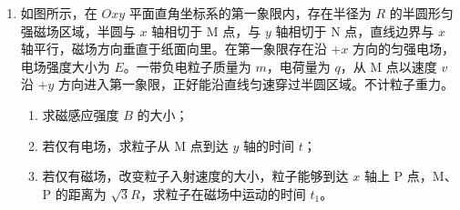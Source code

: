 \documentclass[\gkver]{gaokaozhenti}
\begin{document}
\begin{enumerate}
\item
如图所示，在 $Oxy$ 平面直角坐标系的第一象限内，存在半径为 $R$ 的半圆形匀强磁场区域，半圆与 $x$ 轴相切于 M 点，与 $y$ 轴相切于 N 点，直线边界与 $x$ 轴平行，磁场方向垂直于纸面向里。在第一象限存在沿 $+x$ 方向的匀强电场，电场强度大小为 $E$。一带负电粒子质量为 $m$，电荷量为 $q$，从 M 点以速度 $v$ 沿 $+y$ 方向进入第一象限，正好能沿直线匀速穿过半圆区域。不计粒子重力。
\begin{enumerate}
	\item
	求磁感应强度 $B$ 的大小；
	\item
	若仅有电场，求粒子从 M 点到达 $y$ 轴的时间 $t$；
	\item
	若仅有磁场，改变粒子入射速度的大小，粒子能够到达 $x$ 轴上 P 点，M、P 的距离为 $\sqrt{3}R$，求粒子在磁场中运动的时间 $t_{1}$。
\end{enumerate}
\end{enumerate}
\end{document}
